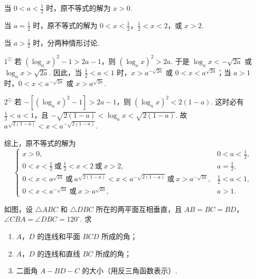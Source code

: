 \documentclass[UTF8,a4paper,oneside,11pt]{ctexbook}
\begin{document}
\begin{solution}
当 \(0 < a < \frac{1}{2}\) 时，原不等式的解为 \(x > 0\).

当 \(a = \frac{1}{2}\) 时，原不等式的解为 \(0 < x < \frac{1}{2}\)，\(\frac{1}{2} < x < 2\)，或 \(x > 2\).

当 \(a > \frac{1}{2}\) 时，分两种情形讨论.

\(1^{\odot}\) 若 \(\left(\log_a x\right)^2 - 1 > 2a - 1\)，则 \(\left(\log_a x\right)^2 > 2a\). 于是 \(\log_a x < -\sqrt{2a}\) 或 \(\log_a x > \sqrt{2a}\). 因此，当 \(\frac{1}{2} < a < 1\) 时，\(x > a^{-\sqrt{2a}}\) 或 \(0 < x < a^{\sqrt{2a}}\)；当 \(a > 1\) 时，\(0 < x < a^{-\sqrt{2a}}\) 或 \(x > a^{\sqrt{2a}}\).

\(2^{\odot}\) 若 \(-\left[\left(\log_a x\right)^2 - 1\right] > 2a - 1\)，则 \(\left(\log_a x\right)^2 < 2(1 - a)\). 这时必有 \(\frac{1}{2} < a < 1\)，且 \(-\sqrt{2(1 - a)} < \log_a x < \sqrt{2(1 - a)}\). 故 \(a^{\sqrt{2(1 - a)}} < x < a^{-\sqrt{2(1 - a)}}\).

综上，原不等式的解为
\[
\begin{cases}
x > 0, & 0 < a < \frac{1}{2},\\[4pt]
0 < x < \frac{1}{2}\ \text{或}\ \frac{1}{2} < x < 2\ \text{或}\ x > 2, & a = \frac{1}{2},\\[4pt]
0 < x < a^{\sqrt{2a}}\ \text{或}\ a^{\sqrt{2(1 - a)}} < x < a^{-\sqrt{2(1 - a)}}\ \text{或}\ x > a^{-\sqrt{2a}}, & \frac{1}{2} < a < 1,\\[4pt]
0 < x < a^{-\sqrt{2a}}\ \text{或}\ x > a^{\sqrt{2a}}, & a > 1.
\end{cases}
\]
\end{solution}

\begin{problem}
如图，设 \(\triangle ABC\) 和 \(\triangle DBC\) 所在的两平面互相垂直，且 \(AB = BC = BD\)，\(\angle CBA = \angle DBC = 120^{\circ}\). 求

\begin{enumerate}
\item \(A\)，\(D\) 的连线和平面 \(BCD\) 所成的角；
\item \(A\)，\(D\) 的连线和直线 \(BC\) 所成的角；
\item 二面角 \(A-BD-C\) 的大小（用反三角函数表示）.
\end{enumerate}

\end{problem}
\end{document}
